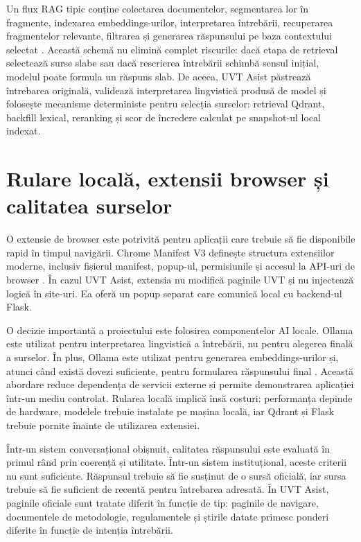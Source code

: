 \documentclass[12pt,a4paper]{report}
\theoremstyle{definition}
\theoremstyle{remark}
\begin{document}
Un flux RAG tipic conține colectarea documentelor, segmentarea lor în fragmente, indexarea embeddings-urilor, interpretarea întrebării, recuperarea fragmentelor relevante, filtrarea și generarea răspunsului pe baza contextului selectat \cite{Lewis2020RAG,Gao2023RAGSurvey}. Această schemă nu elimină complet riscurile: dacă etapa de retrieval selectează surse slabe sau dacă rescrierea întrebării schimbă sensul inițial, modelul poate formula un răspuns slab. De aceea, UVT Asist păstrează întrebarea originală, validează interpretarea lingvistică produsă de model și folosește mecanisme deterministe pentru selecția surselor: retrieval Qdrant, backfill lexical, reranking și scor de încredere calculat pe snapshot-ul local indexat.

\section{Rulare locală, extensii browser și calitatea surselor}
O extensie de browser este potrivită pentru aplicații care trebuie să fie disponibile rapid în timpul navigării. Chrome Manifest V3 definește structura extensiilor moderne, inclusiv fișierul manifest, popup-ul, permisiunile și accesul la API-uri de browser \cite{ChromeMV3}. În cazul UVT Asist, extensia nu modifică paginile UVT și nu injectează logică în site-uri. Ea oferă un popup separat care comunică local cu backend-ul Flask.

O decizie importantă a proiectului este folosirea componentelor AI locale. Ollama este utilizat pentru interpretarea lingvistică a întrebării, nu pentru alegerea finală a surselor. În plus, Ollama este utilizat pentru generarea embeddings-urilor și, atunci când există dovezi suficiente, pentru formularea răspunsului final \cite{OllamaDocs}. Această abordare reduce dependența de servicii externe și permite demonstrarea aplicației într-un mediu controlat. Rularea locală implică însă costuri: performanța depinde de hardware, modelele trebuie instalate pe mașina locală, iar Qdrant și Flask trebuie pornite înainte de utilizarea extensiei.

Într-un sistem conversațional obișnuit, calitatea răspunsului este evaluată în primul rând prin coerență și utilitate. Într-un sistem instituțional, aceste criterii nu sunt suficiente. Răspunsul trebuie să fie susținut de o sursă oficială, iar sursa trebuie să fie suficient de recentă pentru întrebarea adresată. În UVT Asist, paginile oficiale sunt tratate diferit în funcție de tip: paginile de navigare, documentele de metodologie, regulamentele și știrile datate primesc ponderi diferite în funcție de intenția întrebării.
\end{document}

